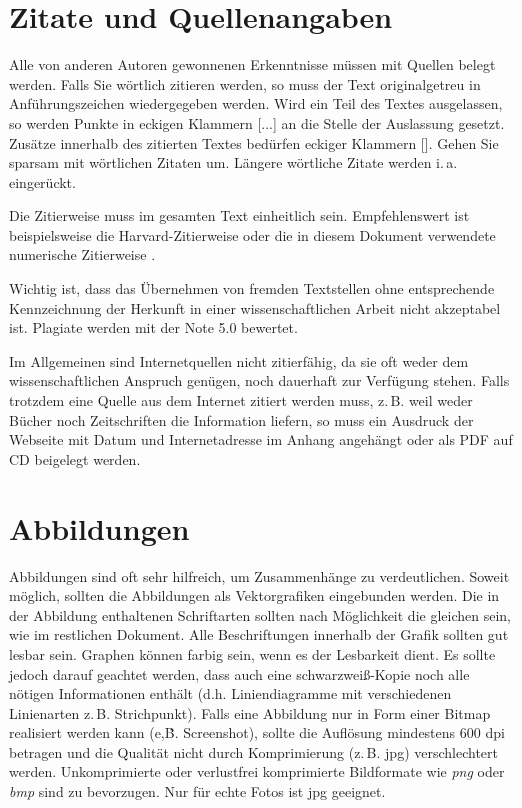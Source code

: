 \documentclass[conference,final,a4paper]{IEEEtran}
\begin{document}
\section{Zitate und Quellenangaben}
Alle von anderen Autoren gewonnenen Erkenntnisse müssen mit Quellen belegt werden. Falls Sie wörtlich zitieren werden, so muss der Text originalgetreu in Anführungszeichen wiedergegeben werden. Wird ein Teil des Textes ausgelassen, so werden Punkte in eckigen Klammern [...] an die Stelle der Auslassung gesetzt. Zusätze innerhalb des zitierten Textes bedürfen eckiger Klammern []. Gehen Sie sparsam mit wörtlichen Zitaten um. Längere wörtliche Zitate werden i.\,a. eingerückt.

Die Zitierweise muss im gesamten Text einheitlich sein. Empfehlenswert ist beispielsweise die Harvard-Zitierweise oder die in diesem Dokument verwendete numerische Zitierweise \cite{kornmeier}.

Wichtig ist, dass das Übernehmen von fremden Textstellen ohne entsprechende Kennzeichnung der Herkunft in einer wissenschaftlichen Arbeit nicht akzeptabel ist. Plagiate werden mit der Note 5.0 bewertet.

Im Allgemeinen sind Internetquellen nicht zitierfähig, da sie oft weder dem wissenschaftlichen Anspruch genügen, noch dauerhaft zur Verfügung stehen. Falls trotzdem eine Quelle aus dem Internet zitiert werden muss, z.\,B. weil weder Bücher noch Zeitschriften die Information liefern, so muss ein Ausdruck der Webseite mit Datum und Internetadresse im Anhang angehängt oder als PDF auf CD beigelegt werden.

\section{Abbildungen}
Abbildungen sind oft sehr hilfreich, um Zusammenhänge zu verdeutlichen. Soweit möglich, sollten die Abbildungen als Vektorgrafiken eingebunden werden. Die in der Abbildung enthaltenen Schriftarten sollten nach Möglichkeit die gleichen sein, wie im restlichen Dokument. Alle Beschriftungen innerhalb der Grafik sollten gut lesbar sein.
Graphen können farbig sein, wenn es der Lesbarkeit dient. Es sollte jedoch darauf geachtet werden, dass auch eine schwarz\-weiß-Kopie noch alle nötigen Informationen enthält (d.h. Liniendiagramme mit verschiedenen Linienarten z.\,B. Strichpunkt).  
Falls eine Abbildung nur in Form einer Bitmap realisiert werden kann (e,\.B. Screenshot), sollte die Auflösung mindestens 600 dpi betragen und die Qualität nicht durch Komprimierung (z.\,B. jpg) verschlechtert werden. Unkomprimierte oder verlustfrei komprimierte Bildformate wie \emph{png} oder \emph{bmp} sind zu bevorzugen. Nur für echte Fotos ist jpg geeignet.
\end{document}
